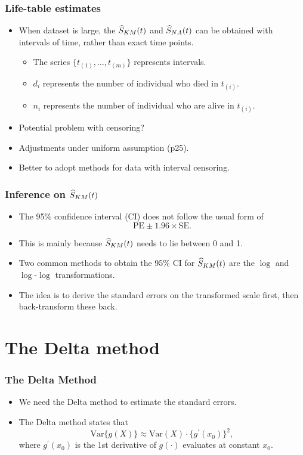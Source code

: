 \documentclass[10pt]{beamer}\usepackage[]{graphicx}\usepackage[]{color}
\newcommand{\Var}{\mathrm{Var}}
\newcommand{\Skm}{\widehat{S}_{\scriptsize{KM}}}
\newcommand{\Sna}{\widehat{S}_{\scriptsize{NA}}}
\begin{document}
\begin{frame}[fragile]
\begin{itemize}
\begin{center}
    \end{center}
  \end{itemize}
\end{frame}


\begin{frame}
  \frametitle{Life-table estimates}
  \begin{itemize}
  \item When dataset is large, the $\Skm(t)$ and $\Sna(t)$ can be obtained with intervals of time, 
    rather than exact time points.
    \begin{itemize}
    \item The series $\{t_{(1)}, \ldots, t_{(m)}\}$ represents intervals. 
    \item $d_i$ represents the number of individual who died in $t_{(i)}$.
    \item $n_i$ represents the number of individual who are alive in $t_{(i)}$.
    \end{itemize}
  \item Potential problem with censoring? 
  \item Adjustments under uniform assumption (p25).
  \item Better to adopt methods for data with interval censoring.
\end{itemize}
\end{frame}

\begin{frame}
  \frametitle{Inference on $\Skm(t)$}
  \begin{itemize}
    \item The 95\% confidence interval (CI) does not follow the usual form of 
      $$\mbox{PE} \pm 1.96 \times\mbox{SE}.$$
    \item This is mainly because $\Skm(t)$ needs to lie between 0 and 1. 
    \item Two common methods to obtain the 95\% CI for $\Skm(t)$ are the
      $\log$ and $\log$-$\log$ transformations.
    \item The idea is to derive the standard errors on the transformed scale first, 
      then back-transform these back.
  \end{itemize}
\end{frame}

\section{The Delta method}
\begin{frame}
  \frametitle{The Delta Method}
  \begin{itemize}
    \item We need the Delta method to estimate the standard errors.
    \item The Delta method states that
      $$ \Var\{g(X)\}\approx \Var(X) \cdot\{g^\prime(x_0)\}^2,$$
      where $g^\prime(x_0)$ is the 1st derivative of $g(\cdot)$ evaluates at constant $x_0$.
  \end{itemize}
\end{frame}
\end{document}

